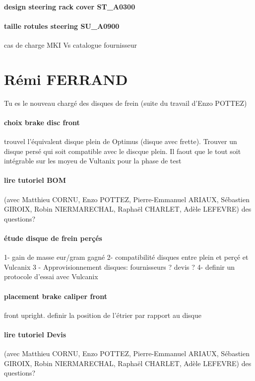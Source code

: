 \paragraph{design steering rack cover ST\_A0300} 
\paragraph{taille rotules steering SU\_A0900} cas de charge MKI Vs catalogue fournisseur

 
 \newpage \section*{Rémi FERRAND} 
 \par Tu es le nouveau chargé des disques de frein (suite du travail d'Enzo POTTEZ)
\paragraph{choix brake disc front} trouvel l'équivalent disque plein de Optimus (disque avec frette). Trouver un disque persé qui soit compatible avec le discque plein. Il faout que le tout soit intégrable sur les moyeu de Vultanix pour la phase de test
\paragraph{lire tutoriel BOM} (avec Matthieu CORNU, Enzo POTTEZ, Pierre-Emmanuel ARIAUX, Sébastien GIROIX, Robin NIERMARECHAL, Raphaël CHARLET, Adèle LEFEVRE) des questions?
\paragraph{étude disque de frein perçés} 1- gain de masse eur/gram gagné
2- compatibilité disques entre plein et perçé et Vulcanix
3 - Approvisionnement disques: fournisseurs ? devis ?
4- definir un protocole d'essai avec Vulcanix

\paragraph{placement brake caliper front} front upright. definir la position de l'étrier par rapport au disque
\paragraph{lire tutoriel Devis} (avec Matthieu CORNU, Enzo POTTEZ, Pierre-Emmanuel ARIAUX, Sébastien GIROIX, Robin NIERMARECHAL, Raphaël CHARLET, Adèle LEFEVRE) des questions?
